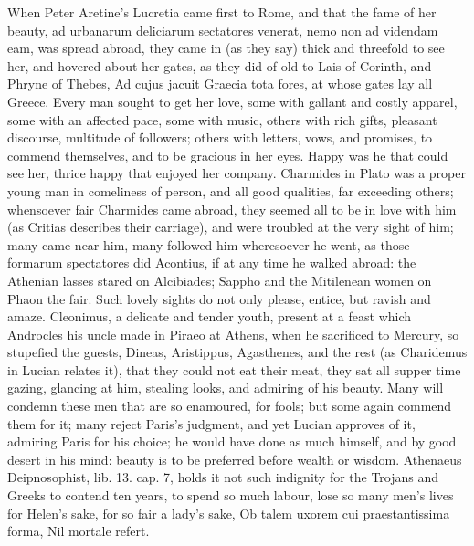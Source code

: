 When Peter Aretine's Lucretia came first to Rome, and that the
fame of her beauty, ad urbanarum deliciarum sectatores venerat, nemo
non ad videndam eam, \etc{} was spread abroad, they came in (as they say)
thick and threefold to see her, and hovered about her gates, as they
did of old to Lais of Corinth, and Phryne of Thebes, Ad cujus
jacuit Graecia tota fores, at whose gates lay all Greece. Every
man sought to get her love, some with gallant and costly apparel, some
with an affected pace, some with music, others with rich gifts,
pleasant discourse, multitude of followers; others with letters, vows,
and promises, to commend themselves, and to be gracious in her eyes.
Happy was he that could see her, thrice happy that enjoyed her company.
Charmides in Plato was a proper young man in comeliness of
person, and all good qualities, far exceeding others; whensoever fair
Charmides came abroad, they seemed all to be in love with him (as
Critias describes their carriage), and were troubled at the very sight
of him; many came near him, many followed him wheresoever he went, as
those formarum spectatores did Acontius, if at any time he walked
abroad: the Athenian lasses stared on Alcibiades; Sappho and the
Mitilenean women on Phaon the fair. Such lovely sights do not only
please, entice, but ravish and amaze. Cleonimus, a delicate and tender
youth, present at a feast which Androcles his uncle made in Piraeo at
Athens, when he sacrificed to Mercury, so stupefied the guests, Dineas,
Aristippus, Agasthenes, and the rest (as Charidemus in Lucian
relates it), that they could not eat their meat, they sat all supper
time gazing, glancing at him, stealing looks, and admiring of his
beauty. Many will condemn these men that are so enamoured, for fools;
but some again commend them for it; many reject Paris's judgment, and
yet Lucian approves of it, admiring Paris for his choice; he would have
done as much himself, and by good desert in his mind: beauty is to be
preferred before wealth or wisdom. Athenaeus Deipnosophist,
lib. 13. cap. 7, holds it not such indignity for the Trojans and Greeks
to contend ten years, to spend so much labour, lose so many men's lives
for Helen's sake, for so fair a lady's sake,
Ob talem uxorem cui praestantissima forma,
Nil mortale refert.

